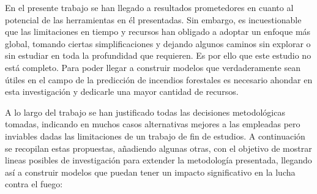 \documentclass[12pt,a4paper,]{book}
\numberwithin{dummy}{section}
\theoremstyle{ocrenumbox}
\theoremstyle{blacknumex}
\theoremstyle{blacknumbox}
\theoremstyle{ocrenum}
\theoremstyle{ocrenum}
\begin{document}
En el presente trabajo se han llegado a resultados prometedores en
cuanto al potencial de las herramientas en él presentadas. Sin embargo,
es incuestionable que las limitaciones en tiempo y recursos han obligado
a adoptar un enfoque más global, tomando ciertas simplificaciones y
dejando algunos caminos sin explorar o sin estudiar en toda la
profundidad que requieren. Es por ello que este estudio no está
completo. Para poder llegar a construir modelos que verdaderamente sean
útiles en el campo de la predicción de incendios forestales es necesario
ahondar en esta investigación y dedicarle una mayor cantidad de
recursos.

A lo largo del trabajo se han justificado todas las decisiones
metodológicas tomadas, indicando en muchos casos alternativas mejores a
las empleadas pero inviables dadas las limitaciones de un trabajo de fin
de estudios. A continuación se recopilan estas propuestas, añadiendo
algunas otras, con el objetivo de mostrar lineas posibles de
investigación para extender la metodología presentada, llegando así a
construir modelos que puedan tener un impacto significativo en la lucha
contra el fuego:
\end{document}
